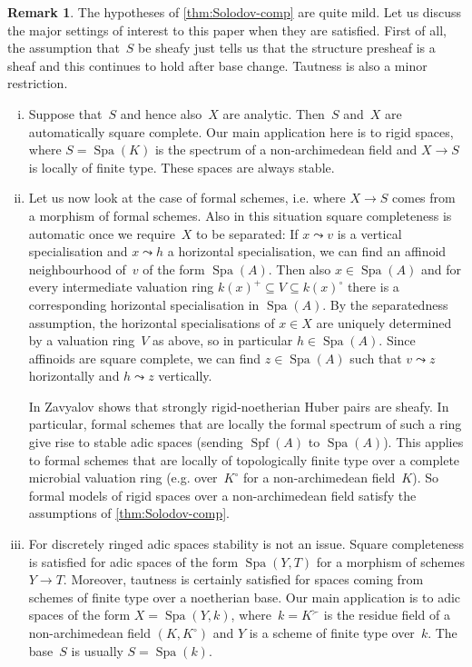 \documentclass[a4paper,twoside,11pt,reqno]{amsart}
\DeclareMathOperator{\Spf}{Spf}
\DeclareMathOperator{\Spa}{Spa}
\theoremstyle{definition}
\newtheorem{rmk}[thm]{Remark}
\numberwithin{equation}{subsection}
\begin{document}
\begin{rmk} \label{rmk:hypotheses-compactification}
    The hypotheses of \cref{thm:Solodov-comp} are quite mild.
    Let us discuss the major settings of interest to this paper when they are satisfied.
    First of all, the assumption that~$S$ be sheafy just tells us that the structure presheaf is a sheaf and this continues to hold after base change.
    Tautness is also a minor restriction.
    \begin{enumerate}[(i)]
        \item Suppose that~$S$ and hence also~$X$ are analytic.
              Then~$S$ and~$X$ are automatically square complete.
              Our main application here is to rigid spaces, where $S = \Spa(K)$ is the spectrum of a non-archimedean field and $X \to S$ is locally of finite type.
              These spaces are always stable.
        \item Let us now look at the case of formal schemes, i.e. where $X \to S$ comes from a morphism of formal schemes.
              Also in this situation square completeness is automatic once we require~$X$ to be separated:
              If $x \leadsto v$ is a vertical specialisation and $x \leadsto h$ a horizontal specialisation, we can find an affinoid neighbourhood of~$v$ of the form $\Spa(A)$.
              Then also $x \in \Spa(A)$ and for every intermediate valuation ring $k(x)^+ \subseteq V \subseteq k(x)^\circ$ there is a corresponding horizontal specialisation in $\Spa(A)$.
              By the separatedness assumption, the horizontal specialisations of $x \in X$ are uniquely determined by a valuation ring~$V$ as above, so in particular $h \in \Spa(A)$.
              Since affinoids are square complete, we can find $z \in \Spa(A)$ such that $v \leadsto z$ horizontally and $h \leadsto z$ vertically.

              In \cite{ZavyalovSheafy} Zavyalov shows that strongly rigid-noetherian Huber pairs are sheafy.
              In particular, formal schemes that are locally the formal spectrum of such a ring give rise to stable adic spaces (sending $\Spf(A)$ to $\Spa(A)$).
              This applies to formal schemes that are locally of topologically finite type over a complete microbial valuation ring (e.g. over~$K^\circ$ for a non-archimedean field~$K$).
              So formal models of rigid spaces over a non-archimedean field satisfy the assumptions of \cref{thm:Solodov-comp}.
        \item For discretely ringed adic spaces stability is not an issue.
              Square completeness is satisfied for adic spaces of the form $\Spa(Y,T)$ for a morphism of schemes $Y \to T$.
              Moreover, tautness is certainly satisfied for spaces coming from schemes of finite type over a noetherian base.
              Our main application is to adic spaces of the form $X = \Spa(Y,k)$, where~$k=K^\succ$ is the residue field of a non-archimedean field $(K,K^\circ)$ and $Y$ is a scheme of finite type over~$k$.
              The base~$S$ is usually $S = \Spa(k)$.
    \end{enumerate}
\end{rmk}
\end{document}
